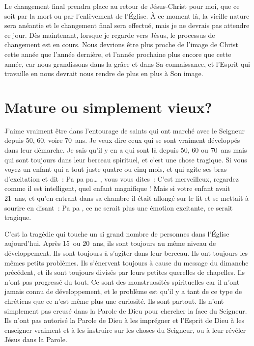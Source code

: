 Le changement final prendra place au retour de Jésus-Christ pour moi,
 que ce soit par la mort ou par l'enlèvement de l'Église.
 À ce moment là, la vieille nature sera anéantie et le changement final
 sera effectué, mais je ne devrais pas attendre ce jour.
 Dès maintenant, lorsque je regarde vers Jésus, le processus de changement
 est en cours. Nous devrions être plus proche de l'image de Christ
 cette année que l'année dernière, et l'année prochaine plus encore
 que cette année, car nous grandissons dans la grâce et dans Sa connaissance,
 et l'Esprit qui travaille en nous devrait nous rendre
 de plus en plus à Son image.


\section{Mature ou simplement vieux?}

J'aime vraiment être dans l'entourage de saints
 qui ont marché avec le Seigneur depuis 50, 60, voire 70~ans.
 Je veux dire ceux qui se sont vraiment développés dans leur démarche.
 Je sais qu'il y en a qui sont là depuis 50, 60 ou 70~ans mais qui sont
 toujours dans leur berceau spirituel, et c'est une chose tragique.
 Si vous voyez un enfant qui a tout juste quatre ou cinq mois,
 et qui agite ses bras d'excitation et dit~:
 \og Pa pa pa\dots{} \fg{}, vous vous dites~:
 \og C'est merveilleux, regardez comme il est intelligent,
 quel enfant magnifique ! \fg{} 
 Mais si votre enfant avait 21~ans, et qu'en entrant dans sa chambre
 il était allongé sur le lit et se mettait à sourire en disant~:
 \og Pa pa \fg{}, ce ne serait plus une émotion excitante,
 ce serait tragique.

C'est la tragédie qui touche un si grand nombre de personnes
 dans l'Église aujourd'hui. Après 15~ou 20~ans,
 ils sont toujours au même niveau de développement.
 Ils sont toujours à s'agiter dans leur berceau.
 Ils ont toujours les mêmes petits problèmes.
 Ils s'éner\-vent toujours à cause du message du dimanche précédent,
 et ils sont toujours divisés par leurs petites querelles de chapelles.
 Ils n'ont pas progressé du tout. Ce sont des monstruosités spirituelles
 car il n'ont jamais connu de développement, et le problème est qu'il y a
 tant de ce type de chrétiens que ce n'est même plus une curiosité.
 Ils sont partout. Ils n'ont simplement pas creusé dans la Parole de Dieu
 pour chercher la face du Seigneur. Ils n'ont pas autorisé la Parole de Dieu
 à les imprégner et l'Esprit de Dieu à les enseigner vraiment et
 à les instruire sur les choses du Seigneur,
 ou à leur révéler Jésus dans la Parole.


